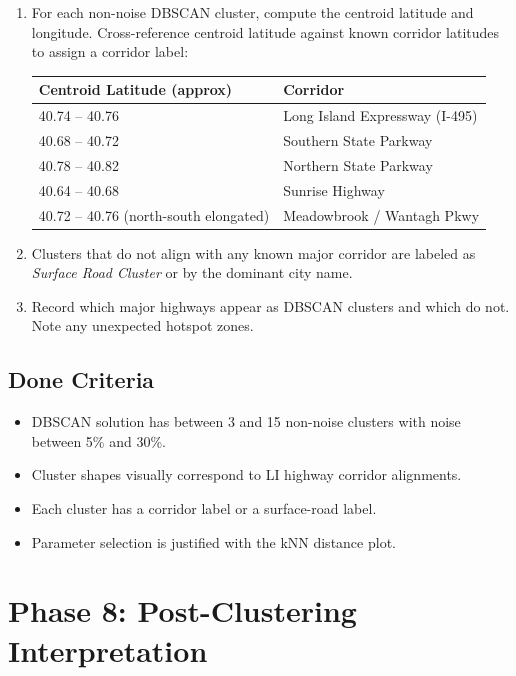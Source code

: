 \documentclass[11pt]{article}
\begin{document}
\begin{enumerate}
  \item For each non-noise DBSCAN cluster, compute the centroid latitude and longitude. Cross-reference centroid latitude against known corridor latitudes to assign a corridor label:

  \begin{center}
  \begin{tabular}{|l|l|}
  \hline
  \textbf{Centroid Latitude (approx)} & \textbf{Corridor} \\
  \hline
  40.74 -- 40.76 & Long Island Expressway (I-495) \\
  40.68 -- 40.72 & Southern State Parkway \\
  40.78 -- 40.82 & Northern State Parkway \\
  40.64 -- 40.68 & Sunrise Highway \\
  40.72 -- 40.76 (north-south elongated) & Meadowbrook / Wantagh Pkwy \\
  \hline
  \end{tabular}
  \end{center}

  \item Clusters that do not align with any known major corridor are labeled as \textit{Surface Road Cluster} or by the dominant city name.

  \item Record which major highways appear as DBSCAN clusters and which do not. Note any unexpected hotspot zones.
\end{enumerate}

\subsection{Done Criteria}

\begin{itemize}
  \item DBSCAN solution has between 3 and 15 non-noise clusters with noise between 5\% and 30\%.
  \item Cluster shapes visually correspond to LI highway corridor alignments.
  \item Each cluster has a corridor label or a surface-road label.
  \item Parameter selection is justified with the kNN distance plot.
\end{itemize}

\newpage
\section{Phase 8: Post-Clustering Interpretation}
\end{document}
